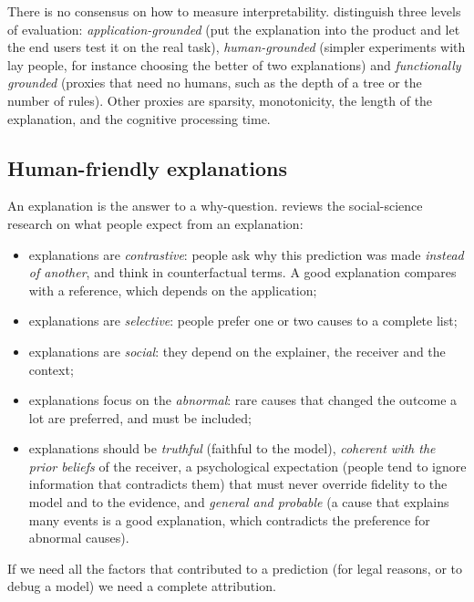 There is no consensus on how to measure interpretability. \citet{doshivelez2017towards} distinguish
three levels of evaluation: \emph{application-grounded} (put the explanation into the product and
let the end users test it on the real task), \emph{human-grounded} (simpler experiments with lay
people, for instance choosing the better of two explanations) and \emph{functionally grounded}
(proxies that need no humans, such as the depth of a tree or the number of rules). Other proxies
are sparsity, monotonicity, the length of the explanation, and the cognitive processing time.

\subsection{Human-friendly explanations}

An explanation is the answer to a why-question. \citet{miller2019explanation} reviews the social-science research on what people
expect from an explanation:
\begin{itemize}
  \item explanations are \emph{contrastive}: people ask why this prediction was made \emph{instead
        of another}, and think in counterfactual terms. A good explanation compares with a
        reference, which depends on the application;
  \item explanations are \emph{selective}: people prefer one or two causes to a complete
        list;
  \item explanations are \emph{social}: they depend on the explainer, the receiver and the context;
  \item explanations focus on the \emph{abnormal}: rare causes that changed the outcome a lot are
        preferred, and must be included;
  \item explanations should be \emph{truthful} (faithful to the model), \emph{coherent with the
        prior beliefs} of the receiver, a psychological expectation (people tend to ignore information
        that contradicts them) that must never override fidelity to the model and to the evidence,
        and \emph{general and probable} (a cause that explains many events is a good explanation,
        which contradicts the preference for abnormal causes).
\end{itemize}
If we need all the factors that contributed to a prediction (for legal reasons, or to debug a
model) we need a complete attribution.


